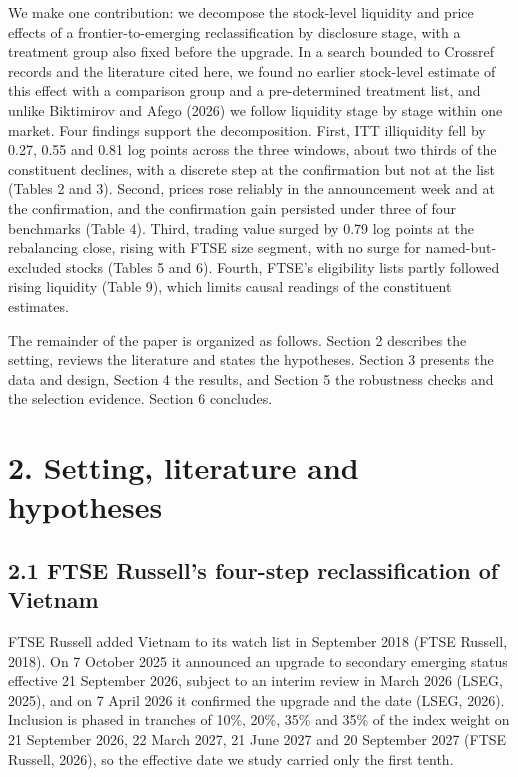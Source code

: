 \documentclass[review,authoryear,12pt]{elsarticle}
\begin{document}
We make one contribution: we decompose the stock-level liquidity and
price effects of a frontier-to-emerging reclassification by disclosure
stage, with a treatment group also fixed before the upgrade. In a search
bounded to Crossref records and the literature cited here, we found no
earlier stock-level estimate of this effect with a comparison group and
a pre-determined treatment list, and unlike Biktimirov and Afego (2026)
we follow liquidity stage by stage within one market. Four findings
support the decomposition. First, ITT illiquidity fell by 0.27, 0.55 and
0.81 log points across the three windows, about two thirds of the
constituent declines, with a discrete step at the confirmation but not
at the list (Tables 2 and 3). Second, prices rose reliably in the
announcement week and at the confirmation, and the confirmation gain
persisted under three of four benchmarks (Table 4). Third, trading value
surged by 0.79 log points at the rebalancing close, rising with FTSE
size segment, with no surge for named-but-excluded stocks (Tables 5 and
6). Fourth, FTSE's eligibility lists partly followed rising liquidity
(Table 9), which limits causal readings of the constituent estimates.

The remainder of the paper is organized as follows. Section 2 describes
the setting, reviews the literature and states the hypotheses. Section 3
presents the data and design, Section 4 the results, and Section 5 the
robustness checks and the selection evidence. Section 6 concludes.

\hypertarget{setting-literature-and-hypotheses}{%
\section*{2. Setting, literature and
hypotheses}}

\hypertarget{ftse-russells-four-step-reclassification-of-vietnam}{%
\subsection*{2.1 FTSE Russell's four-step reclassification of
Vietnam}}

FTSE Russell added Vietnam to its watch list in September 2018 (FTSE
Russell, 2018). On 7 October 2025 it announced an upgrade to secondary
emerging status effective 21 September 2026, subject to an interim
review in March 2026 (LSEG, 2025), and on 7 April 2026 it confirmed the
upgrade and the date (LSEG, 2026). Inclusion is phased in tranches of
10\%, 20\%, 35\% and 35\% of the index weight on 21 September 2026, 22
March 2027, 21 June 2027 and 20 September 2027 (FTSE Russell, 2026), so
the effective date we study carried only the first tenth.
\end{document}
